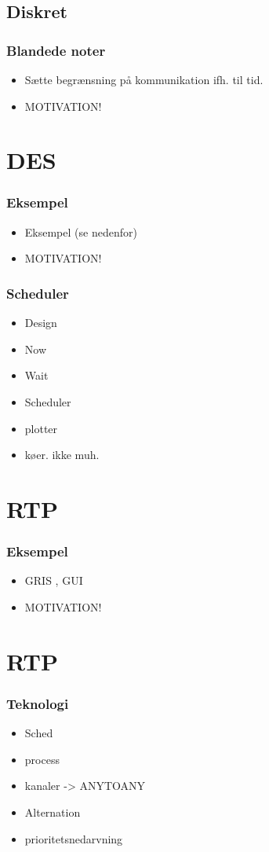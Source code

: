 \documentclass{beamer}
\begin{document}
\subsection{Diskret}
\begin{frame}
  \frametitle{Blandede noter}
  \begin{itemize}
    
    \item Sætte begrænsning på kommunikation ifh. til tid.
    \item MOTIVATION!
  \end{itemize}
\end{frame}

\section{DES}
\begin{frame}
  \frametitle{Eksempel}
  \begin{itemize}   
    \item Eksempel (se nedenfor)
	
    \item MOTIVATION!
  \end{itemize}
\end{frame}

\begin{frame}
  \frametitle{Scheduler}
  \begin{itemize}   
\item Design	
    \item Now
\item Wait
\item Scheduler
\item plotter
\item køer. ikke muh.
  \end{itemize}
\end{frame}


\section{RTP}
\begin{frame}
  \frametitle{Eksempel}
  \begin{itemize}   
    \item GRIS , GUI	
    \item MOTIVATION!
  \end{itemize}
\end{frame}

\section{RTP}
\begin{frame}
  \frametitle{Teknologi}
  \begin{itemize}   
    \item Sched	
    \item process
	\item kanaler -> ANYTOANY
	\item Alternation
	\item prioritetsnedarvning
  \end{itemize}
\end{frame}
\end{document}
